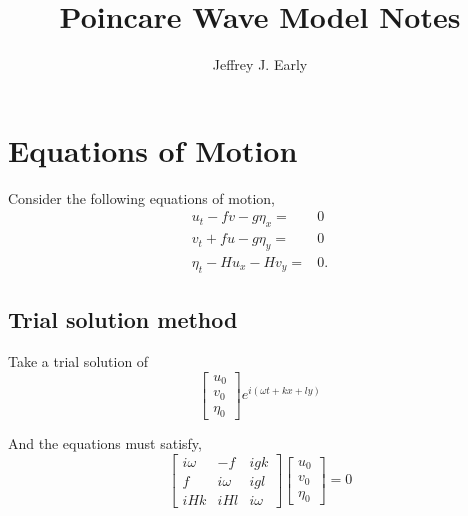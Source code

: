 \documentclass[11pt]{amsart}
\title{Poincare Wave Model Notes}
\author{Jeffrey J. Early}
\begin{document}
\maketitle

%
%
\section{Equations of Motion}
%
%



Consider the following equations of motion,
\begin{align}
u_t  -f v - g\eta_x =& 0 \\
v_t + f u - g\eta_y =& 0 \\
\eta_t - H u_x - H v_y =&0.
\end{align}

%
\subsection{Trial solution method}
%

Take a trial solution of
\begin{equation}
\left[\begin{array}{c}u_0 \\v_0 \\ \eta_0\end{array}\right]
e^{i(\omega t + kx + ly)}
\end{equation}

And the equations must satisfy,
\begin{equation}
\left[\begin{array}{ccc}
i\omega & -f & igk \\
 f  & i\omega  & igl \\
i H k & i H l & i\omega
\end{array}\right]
\left[\begin{array}{c}u_0 \\v_0 \\ \eta_0\end{array}\right]
=0
\end{equation}
\end{document}
